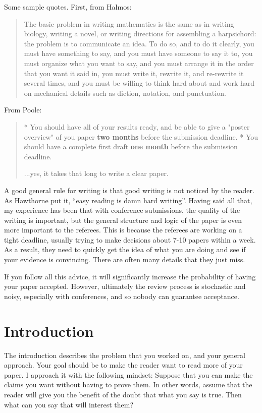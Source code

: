 \documentclass{article}
\begin{document}
Some sample quotes. First, from Halmos:

\begin{quote}
The basic problem in writing mathematics is the same as in writing biology, writing a novel, or writing directions for assembling a harpsichord: the problem is to communicate an idea. To do so, and to do it clearly, you must have something to say, and you must have someone to say it to, you must organize what you want to say, and you must arrange it in the order that you want it said in, you must write it, rewrite it, and re-rewrite it several times, and you must be willing to think hard about and work hard on mechanical details such as diction, notation, and punctuation.
\end{quote}

From Poole:

\begin{quote}
    * You should have all of your results ready, and be able to give a "poster overview" of you paper \textbf{two months} before the submission deadline.
    * You should have a complete first draft \textbf{one month} before the submission deadline.

...yes, it takes that long to write a clear paper.
\end{quote}

A good general rule for writing is that good writing is not noticed by the reader. As Hawthorne put it, ``easy reading is damn hard writing''. Having said all that, my experience has been that with conference submissions, the quality of the writing is important, but the general structure and logic of the paper is even more important to the referees. This is because the referees are working on a tight deadline, usually trying to make decisions about 7-10 papers within a week. As a result, they need to quickly get the idea of what you are doing and see if your evidence is convincing. There are often many details that they just miss. 

If you follow all this advice, it will significantly increase the probability of having your paper accepted. However, ultimately the review process is stochastic and noisy, especially with conferences, and so nobody can guarantee acceptance.


\section{Introduction}
The introduction describes the problem that you worked on, and your general approach. Your goal should be to make the reader want to read more of your paper. I approach it with the following mindset: Suppose that you can make the claims you want without having to prove them. In other words, assume that the reader will give you the benefit of the doubt that what you say is true. Then what can you say that will interest them?
\end{document}
